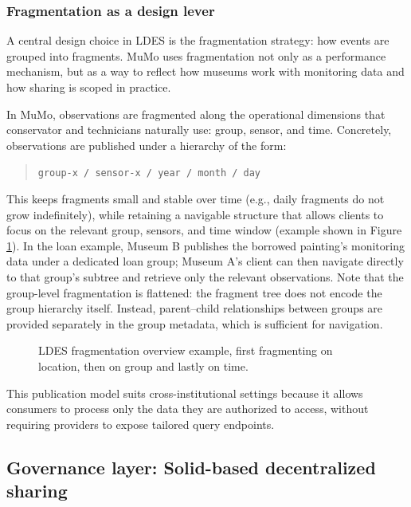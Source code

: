 \documentclass{ceurart}
\begin{document}
\subsubsection{Fragmentation as a design
lever}\label{fragmentation-as-a-design-lever}

A central design choice in LDES is the fragmentation strategy: how
events are grouped into fragments. MuMo uses fragmentation not only as a
performance mechanism, but as a way to reflect how museums work with
monitoring data and how sharing is scoped in practice.

In MuMo, observations are fragmented along the operational dimensions
that conservator and technicians naturally use: group, sensor, and time.
Concretely, observations are published under a hierarchy of the form:

\begin{quote}
\texttt{group-x\ /\ sensor-x\ /\ year\ /\ month\ /\ day}
\end{quote}

This keeps fragments small and stable over time (e.g., daily fragments
do not grow indefinitely), while retaining a navigable structure that
allows clients to focus on the relevant group, sensors, and time window
(example shown in Figure \ref{fig:ldes}). In the loan example, Museum B
publishes the borrowed painting's monitoring data under a dedicated loan
group; Museum A's client can then navigate directly to that group's
subtree and retrieve only the relevant observations. Note that the
group-level fragmentation is flattened: the fragment tree does not
encode the group hierarchy itself. Instead, parent--child relationships
between groups are provided separately in the group metadata, which is
sufficient for navigation.

\begin{figure}
\centering

\caption{LDES fragmentation overview example, first fragmenting on
location, then on group and lastly on time.}\label{fig:ldes}
\end{figure}

This publication model suits cross-institutional settings because it
allows consumers to process only the data they are authorized to access,
without requiring providers to expose tailored query endpoints.

\subsection{Governance layer: Solid-based decentralized
sharing}\label{sec:governance}
\end{document}
